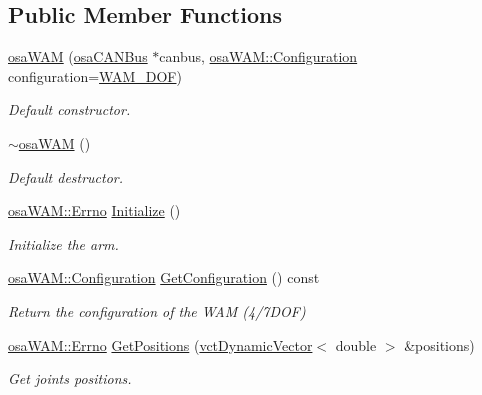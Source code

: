 \subsection*{Public Member Functions}
\begin{DoxyCompactItemize}
\item 
\hyperlink{classosa_w_a_m_a5ebcc841e7184ec8dd8114076c462c37}{osa\-W\-A\-M} (\hyperlink{classosa_c_a_n_bus}{osa\-C\-A\-N\-Bus} $\ast$canbus, \hyperlink{classosa_w_a_m_ada0b00e10e6401b6b1801cd08f30748b}{osa\-W\-A\-M\-::\-Configuration} configuration=\hyperlink{classosa_w_a_m_ada0b00e10e6401b6b1801cd08f30748ba1bdf2662bd26c893783934b814db4ac3}{W\-A\-M\-\_\-D\-O\-F})
\begin{DoxyCompactList}\small\item\em Default constructor. \end{DoxyCompactList}\item 
\hyperlink{classosa_w_a_m_a11571a3eda30ca9fe1d977109e31eef1}{$\sim$osa\-W\-A\-M} ()
\begin{DoxyCompactList}\small\item\em Default destructor. \end{DoxyCompactList}\item 
\hyperlink{classosa_w_a_m_aff15893cc52d67e46cb66de794109f9e}{osa\-W\-A\-M\-::\-Errno} \hyperlink{classosa_w_a_m_a8ea60d9ba5afb2a058b09b4176675e68}{Initialize} ()
\begin{DoxyCompactList}\small\item\em Initialize the arm. \end{DoxyCompactList}\item 
\hyperlink{classosa_w_a_m_ada0b00e10e6401b6b1801cd08f30748b}{osa\-W\-A\-M\-::\-Configuration} \hyperlink{classosa_w_a_m_a3e5642537e9e8de6c3867b16f9b57faa}{Get\-Configuration} () const 
\begin{DoxyCompactList}\small\item\em Return the configuration of the W\-A\-M (4/7\-D\-O\-F) \end{DoxyCompactList}\item 
\hyperlink{classosa_w_a_m_aff15893cc52d67e46cb66de794109f9e}{osa\-W\-A\-M\-::\-Errno} \hyperlink{classosa_w_a_m_a9f9ab19fcba55b121e237368ad65d4aa}{Get\-Positions} (\hyperlink{classvct_dynamic_vector}{vct\-Dynamic\-Vector}$<$ double $>$ \&positions)
\begin{DoxyCompactList}\small\item\em Get joints positions. \end{DoxyCompactList}\item 

\end{DoxyCompactItemize}
